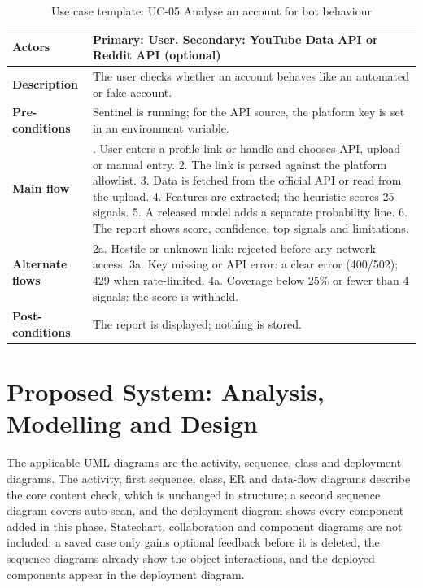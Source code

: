 \begin{table}[H]
\centering
\footnotesize
\renewcommand{\arraystretch}{1.2}
\caption{Use case template: UC-05 Analyse an account for bot behaviour}
\label{tab:uc5}
\begin{tabular}{|>{\raggedright\arraybackslash}p{2.9cm}|>{\raggedright\arraybackslash}p{12.0cm}|}
\hline
\textbf{Actors} & Primary: User. Secondary: YouTube Data API or Reddit API (optional) \\ \hline
\textbf{Description} & The user checks whether an account behaves like an automated or fake account. \\ \hline
\textbf{Pre-conditions} & Sentinel is running; for the API source, the platform key is set in an environment variable. \\ \hline
\textbf{Main flow} & 1. User enters a profile link or handle and chooses API, upload or manual entry. 2. The link is parsed against the platform allowlist. 3. Data is fetched from the official API or read from the upload. 4. Features are extracted; the heuristic scores 25 signals. 5. A released model adds a separate probability line. 6. The report shows score, confidence, top signals and limitations. \\ \hline
\textbf{Alternate flows} & 2a. Hostile or unknown link: rejected before any network access. 3a. Key missing or API error: a clear error (400/502); 429 when rate-limited. 4a. Coverage below 25\% or fewer than 4 signals: the score is withheld. \\ \hline
\textbf{Post-conditions} & The report is displayed; nothing is stored. \\ \hline
\end{tabular}
\end{table}

\section{Proposed System: Analysis, Modelling and Design}
\noindent The applicable UML diagrams are the activity, sequence, class and deployment diagrams. The activity, first sequence, class, ER and data-flow diagrams describe the core content check, which is unchanged in structure; a second sequence diagram covers auto-scan, and the deployment diagram shows every component added in this phase. Statechart, collaboration and component diagrams are not included: a saved case only gains optional feedback before it is deleted, the sequence diagrams already show the object interactions, and the deployed components appear in the deployment diagram.

